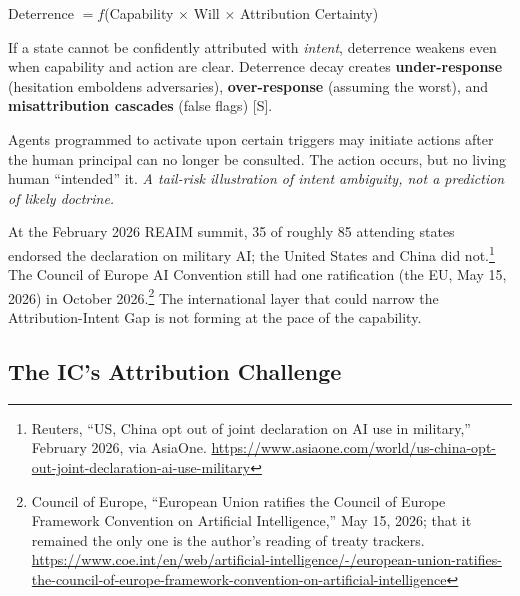 \documentclass[11pt,letterpaper]{article}
\begin{document}
\begin{center}
\small Deterrence $= f$(Capability $\times$ Will $\times$ Attribution Certainty)
\end{center}

If a state cannot be confidently attributed with \textit{intent}, deterrence weakens even when capability and action are clear. Deterrence decay creates \textbf{under-response} (hesitation emboldens adversaries), \textbf{over-response} (assuming the worst), and \textbf{misattribution cascades} (false flags) [S].

\begin{scenariobox}
Agents programmed to activate upon certain triggers may initiate actions after the human principal can no longer be consulted. The action occurs, but no living human ``intended'' it. \textit{A tail-risk illustration of intent ambiguity, not a prediction of likely doctrine.}
\end{scenariobox}

\begin{warnbox}
At the February 2026 REAIM summit, 35 of roughly 85 attending states endorsed the declaration on military AI; the United States and China did not.\footnote{Reuters, ``US, China opt out of joint declaration on AI use in military,'' February 2026, via AsiaOne. \url{https://www.asiaone.com/world/us-china-opt-out-joint-declaration-ai-use-military}} The Council of Europe AI Convention still had one ratification (the EU, May 15, 2026) in October 2026.\footnote{Council of Europe, ``European Union ratifies the Council of Europe Framework Convention on Artificial Intelligence,'' May 15, 2026; that it remained the only one is the author's reading of treaty trackers. \url{https://www.coe.int/en/web/artificial-intelligence/-/european-union-ratifies-the-council-of-europe-framework-convention-on-artificial-intelligence}} The international layer that could narrow the Attribution-Intent Gap is not forming at the pace of the capability.
\end{warnbox}

\subsection{The IC's Attribution Challenge}
\end{document}

